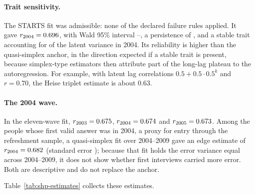 

\paragraph{Trait sensitivity.}
The STARTS fit was admissible: none of the declared failure rules applied. It gave $r_{2004}=\resultnum{j.shp.starts.estimate}{0.696}$, with Wald 95\% interval --, a persistence of , and a stable trait accounting for  of the latent variance in 2004. Its reliability is higher than the quasi-simplex anchor, in the direction expected if a stable trait is present, because simplex-type estimators then attribute part of the long-lag plateau to the autoregression. For example, with latent lag correlations $0.5+0.5\cdot0.5^k$ and $r=0.70$, the Heise triplet estimate is about 0.63. %

\paragraph{The 2004 wave.}
In the eleven-wave fit, $r_{2003}=\resultnum{j.shp.wave.r2003}{0.675}$, $r_{2004}=\resultnum{v4.shp.estimate}{0.674}$ and $r_{2005}=\resultnum{j.shp.wave.r2005}{0.673}$. Among the  people whose first valid answer was in 2004, a proxy for entry through the refreshment sample, a quasi-simplex fit over 2004--2009 gave an edge estimate of $r_{2004}=\resultnum{j.shp.refresh.r2004}{0.682}$ (standard error ); because that fit holds the error variance equal across 2004--2009, it does not show whether first interviews carried more error. Both are descriptive and do not replace the anchor.

Table~\ref{tab:shp-estimates} collects these estimates.

